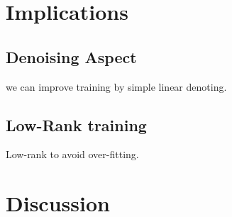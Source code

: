 \documentclass{article}
\begin{document}
\section{Implications} 

\subsection{Denoising Aspect}
we can improve training by simple linear denoting.

\subsection{Low-Rank training}
Low-rank to avoid over-fitting.


\section{Discussion}

\nocite{*}


\end{document}
